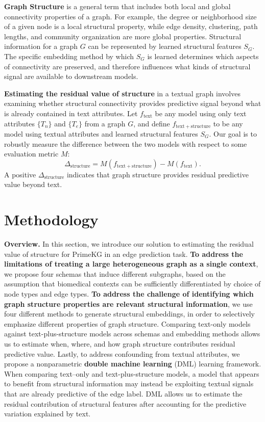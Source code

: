 \documentclass{article}
\theoremstyle{plain}
\theoremstyle{definition}
\theoremstyle{remark}
\begin{document}
\textbf{Graph Structure} is a general term that includes both local and global connectivity properties of a graph. For example, the degree or neighborhood size of a given node is a local structural property, while edge density, clustering, path lengths, and community organization are more global properties. Structural information for a graph $G$ can be represented by learned structural features $S_G$. The specific embedding method by which $S_G$ is learned determines which aspects of connectivity are preserved, and therefore influences what kinds of structural signal are available to downstream models.

\textbf{Estimating the residual value of structure} in a textual graph involves examining whether structural connectivity provides predictive signal beyond what is already contained in text attributes. Let $f_{\mathrm{text}}$ be any model using only text attributes $\{T_{n}\}$ and $\{T_e\}$ from a graph $G$, and define $f_{\mathrm{text+structure}}$ to be any model using textual attributes and learned structural features $S_{G}$. Our goal is to robustly measure the difference between the two models with respect to some evaluation metric $M$:
$$
\Delta_{\mathrm{structure}} = M(f_{\mathrm{text+structure}}) - M(f_{\mathrm{text}}).
$$
A positive $\Delta_{\mathrm{structure}}$ indicates that graph structure provides residual predictive value beyond text.

\section{Methodology}
\label{sec:method}

\textbf{Overview.} In this section, we introduce our solution to estimating the residual value of structure for PrimeKG in an edge prediction task. \textbf{To address the limitations of treating a large heterogeneous graph as a single context}, we propose four schemas that induce different subgraphs, based on the assumption that biomedical contexts can be sufficiently differentiated by choice of node types and edge types. \textbf{To address the challenge of identifying which graph structure properties are relevant structural information}, we use four different methods to generate structural embeddings, in order to selectively emphasize different properties of graph structure. Comparing text-only models against text-plus-structure models across schemas and embedding methods allows us to estimate when, where, and how graph structure contributes residual predictive value. Lastly, to address confounding from textual attributes, we propose a nonparametric \textbf{double machine learning} (DML) learning framework. When comparing text--only and text-plus-structure models, a model that appears to benefit from structural information may instead be exploiting textual signals that are already predictive of the edge label. DML allows us to estimate the residual contribution of structural features after accounting for the predictive variation explained by text.
\end{document}
